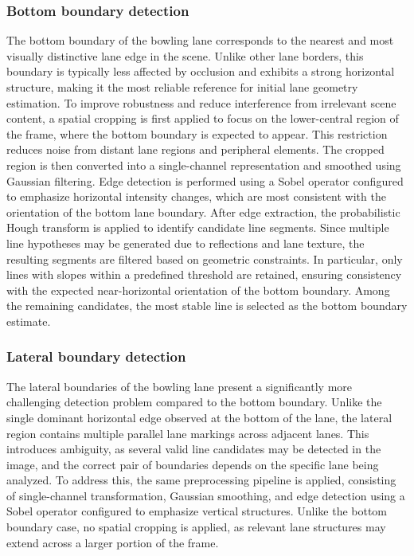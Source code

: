 \subsubsection{Bottom boundary detection}
The bottom boundary of the bowling lane corresponds to the nearest and most visually distinctive lane edge in the scene. Unlike other lane borders, this boundary is typically less affected by occlusion and exhibits a strong horizontal structure, making it the most reliable reference for initial lane geometry estimation.
To improve robustness and reduce interference from irrelevant scene content, a spatial cropping is first applied to focus on the lower-central region of the frame, where the bottom boundary is expected to appear. This restriction reduces noise from distant lane regions and peripheral elements.
The cropped region is then converted into a single-channel representation and smoothed using Gaussian filtering. Edge detection is performed using a Sobel operator configured to emphasize horizontal intensity changes, which are most consistent with the orientation of the bottom lane boundary.
After edge extraction, the probabilistic Hough transform is applied to identify candidate line segments. Since multiple line hypotheses may be generated due to reflections and lane texture, the resulting segments are filtered based on geometric constraints. In particular, only lines with slopes within a predefined threshold are retained, ensuring consistency with the expected near-horizontal orientation of the bottom boundary.
Among the remaining candidates, the most stable line is selected as the bottom boundary estimate. 

\subsubsection{Lateral boundary detection}
The lateral boundaries of the bowling lane present a significantly more challenging detection problem compared to the bottom boundary. Unlike the single dominant horizontal edge observed at the bottom of the lane, the lateral region contains multiple parallel lane markings across adjacent lanes. This introduces ambiguity, as several valid line candidates may be detected in the image, and the correct pair of boundaries depends on the specific lane being analyzed.
To address this, the same preprocessing pipeline is applied, consisting of single-channel transformation, Gaussian smoothing, and edge detection using a Sobel operator configured to emphasize vertical structures. Unlike the bottom boundary case, no spatial cropping is applied, as relevant lane structures may extend across a larger portion of the frame.

